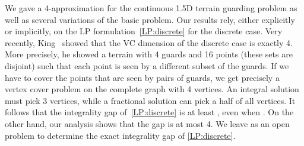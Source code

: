 \documentclass[11pt]{article}
\begin{document}
We gave a 4-approximation for the continuous 1.5D terrain guarding problem as
well as several variations of the basic problem. Our results rely, either
explicitly or implicitly, on the LP formulation~\eqref{LP:discrete} for the
discrete case. Very recently, King~\cite{conf/cccg/King08} showed that the VC
dimension of the discrete case is exactly 4. More precisely, he showed a
terrain with 4 guards and 16 points (these sets are disjoint) such that each
point is seen by a different subset of the guards. If we have to cover the
points that are seen by pairs of guards, we get precisely a vertex cover
problem on the complete graph with 4 vertices. An integral solution must pick
3 vertices, while a fractional solution can pick a half of all vertices. It
follows that
the integrality gap of~\eqref{LP:discrete} is at least , even when . On the other hand, our analysis shows that the gap is at most 4. We leave as an open problem to determine the exact integrality gap of \eqref{LP:discrete}.





\end{document}
